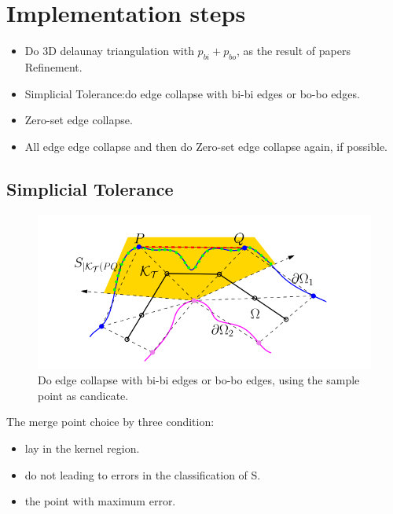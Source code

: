 \documentclass{article}
\theoremstyle{definition}
\theoremstyle{remark}
\begin{document}
  \section{Implementation steps}
  \begin{itemize}
    \item Do 3D delaunay triangulation with $p_{bi}+p_{bo}$, as the result of papers Refinement.
    \item Simplicial Tolerance:do edge collapse with bi-bi edges or bo-bo edges.
    \item Zero-set edge collapse.
    \item All edge edge collapse and then do Zero-set edge collapse again, if possible.
  \end{itemize}
  \subsection{Simplicial Tolerance}
  \begin{figure}[h]
    \includegraphics[width=\textwidth]{simplicial_tolerance.png}
    \caption{Do edge collapse with bi-bi edges or bo-bo edges, using the sample point as candicate.}
  \end{figure}
  The merge point choice by three condition:
  \begin{itemize}
    \item lay in the kernel region.
    \item do not leading to errors in the classification of S.
    \item the point with maximum error.
  \end{itemize}
\end{document}

